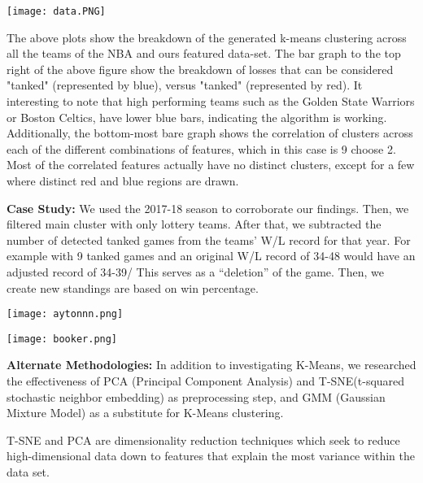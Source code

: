 \documentclass{article}
\begin{document}
\bigbreak
\bigbreak
{}

\begin{center}
    \texttt{[image: data.PNG]}
\end{center}

The above plots show the breakdown of the generated k-means clustering across all the teams of the NBA and ours featured data-set. The bar graph to the top right of the above figure show the breakdown of losses that can be considered "tanked" (represented by blue), versus "tanked" (represented by red). It interesting to note that high performing teams such as the Golden State Warriors or Boston Celtics, have lower blue bars, indicating the algorithm is working. Additionally, the bottom-most bare graph shows the correlation of clusters across each of the different combinations of features, which in this case is 9 choose 2. Most of the correlated features actually have no distinct clusters, except for a few where distinct red and blue regions are drawn.


\bigbreak
\bigbreak
\textbf{Case Study:} We used the 2017-18 season to corroborate our findings. Then, we filtered main cluster with only lottery teams. After that, we subtracted the number of detected tanked games from the teams’ W/L record for that year. For example with 9 tanked games and an original W/L record of 34-48 would have an adjusted record of 34-39/ This serves as a “deletion” of the game. Then, we create new standings are based on win percentage.

\begin{center}
    \texttt{[image: aytonnn.png]}
\end{center}

\begin{center}
    \texttt{[image: booker.png]}
\end{center}
\bigbreak

\bigbreak

\textbf{Alternate Methodologies:} In addition to investigating K-Means, we researched the effectiveness of PCA (Principal Component Analysis) and T-SNE(t-squared stochastic neighbor embedding) as preprocessing step, and GMM (Gaussian Mixture Model) as a substitute for K-Means clustering.

T-SNE and PCA are dimensionality reduction techniques which seek to reduce high-dimensional data down to features that explain the most variance within the data set.
\end{document}
